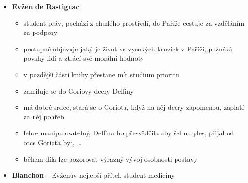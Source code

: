 \documentclass[10pt,a4paper]{article}
\begin{document}
\begin{itemize}
\item \textbf{Evžen de Rastignac}
	\begin{itemize}
	\item student práv, pochází z chudého prostředí, do Paříže cestuje za vzděláním za podpory
	\item postupně objevuje jaký je život ve vysokých kruzích v Paříži, poznává povahy lidí a ztrácí své morální hodnoty
	\item v pozdější části knihy přestane mít studium prioritu
	\item zamiluje se do Goriovy dcery Delfíny
	\item má dobré srdce, stará se o Goriota, když na něj dcery zapomenou, zaplatí za něj pohřeb 
	\item lehce manipulovatelný, Delfína ho přesvědčila aby šel na ples, přijal od otce Goriota byt, \ldots
	\item během díla lze pozorovat výrazný vývoj osobnosti postavy
	\end{itemize}
	
\item \textbf{Bianchon} -- Evženův nejlepší přítel, student medicíny


\end{itemize}
\end{document}

